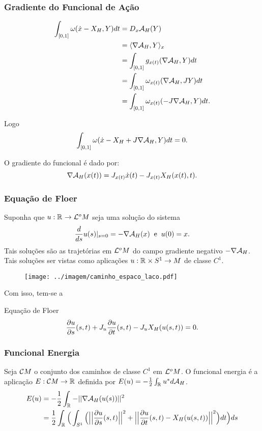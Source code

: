 \documentclass{beamer}
\begin{document}
\begin{footnotesize}
\begin{frame}
\begin{itemize}
			
		\end{itemize}	
	\end{frame}
	
	\begin{frame}
		\frametitle{Gradiente do Funcional de Ação}
		$$
		\begin{aligned}
		\int_{[0,1]} \omega(\dot{x} - X_{H}, Y)dt&=
		D_{x}\mathcal{A}_{H}(Y)
		\\ 
		&= \langle \nabla \mathcal{A}_{H}, Y \rangle_{x}
		\\
		&= \int_{[0,1]}g_{x(t)}(\nabla \mathcal{A}_{H}, Y)dt
		\\
		&=\int_{[0,1]} \omega_{x(t)}(\nabla \mathcal{A}_{H}, JY)dt
		\\
		&=\int_{[0,1]} \omega_{x(t)}(-J\nabla \mathcal{A}_{H}, Y)dt.
		\end{aligned}
		$$
				
			
		Logo
		$$
		\int_{[0,1]} \omega(\dot{x} - X_{H} + J\nabla \mathcal{A}_{H}, Y)dt = 0.
		$$
		\begin{block}{O gradiente do funcional é dado por:}
			$$
			\nabla \mathcal{A}_{H}(x(t))= J_{x(t)}\dot{x}(t)-J_{x(t)}X_{H}(x(t), t).
			$$
		\end{block}
		
	\end{frame}
	
	\begin{frame}
		\frametitle{Equação de Floer}
		Suponha que $u :\mathbb{R}^{}\to \mathcal{L}^{o}M$ seja uma solução do sistema 
	$$
	\frac{d }{d s}u(s)|_{s=0} = -\nabla \mathcal{A}_{H}(x) \;\;\text{e}\;\;u(0)=x.
	$$
	Tais soluções são as trajetórias em $\mathcal{L}^{o}M$ do campo gradiente negativo $-\nabla \mathcal{A}_{H}$. Tais soluções ser vistas como aplicações $u:\mathbb{R}^{} \times S^{1} \to M$ de classe $C^{1}$.
	\begin{figure}[!h]
		\centering
		\texttt{[image: ../imagem/caminho\_espaco\_laco.pdf]}
	\end{figure} 
		
		Com isso, tem-se a
		\begin{block}{Equação de Floer}
			$$
			\frac{\partial u}{\partial s}(s,t) + J_{u}\frac{\partial u}{\partial t}(s,t) - J_{u}X_{H}(u(s,t))=0.
			$$
		\end{block}
	\end{frame}
	
	\begin{frame}
		\frametitle{Funcional Energia}
		
		Seja $\mathcal{C}M$ o conjunto dos caminhos de classe $C^{1}$ em $\mathcal{L}^{o}M$. O funcional energia é a aplicação $E: \mathcal{C}M \to \mathbb{R}^{}$ definida por $E(u)
		=-\frac{1}{2}\int_{\mathbb{R}^{}}u^{*}d\mathcal{A}_{H}$.
		$$
		\begin{aligned}
			E(u) &= -\frac{1}{2}\int_{\mathbb{R}^{}}-||\nabla \mathcal{A}_{H}(u(s))||^{2}
			\\
			&= \frac{1}{2}\int_{\mathbb{R}^{}}\Big(  \int_{S^{1}} \Big( \Big|\Big|\frac{\partial u}{\partial s}(s,t)\Big|\Big|^{2} + \Big|\Big|\frac{\partial u}{\partial t}(s,t) - X_{H}(u(s,t))\Big|\Big|^{2} \Big) dt  \Big)ds
		\end{aligned}
		$$
		

\end{frame}
\end{footnotesize}
\end{document}
